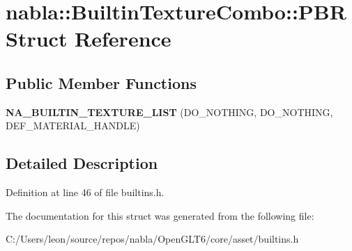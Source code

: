 \hypertarget{structnabla_1_1_builtin_texture_combo_1_1_p_b_r}{}\section{nabla\+::Builtin\+Texture\+Combo\+::P\+BR Struct Reference}
\label{structnabla_1_1_builtin_texture_combo_1_1_p_b_r}
\subsection*{Public Member Functions}
\begin{DoxyCompactItemize}
\item 
\mbox{\label{structnabla_1_1_builtin_texture_combo_1_1_p_b_r_ab6ad00dbe2325783e341075f3216237e}} 
{\bfseries N\+A\+\_\+\+B\+U\+I\+L\+T\+I\+N\+\_\+\+T\+E\+X\+T\+U\+R\+E\+\_\+\+L\+I\+ST} (D\+O\+\_\+\+N\+O\+T\+H\+I\+NG, D\+O\+\_\+\+N\+O\+T\+H\+I\+NG, D\+E\+F\+\_\+\+M\+A\+T\+E\+R\+I\+A\+L\+\_\+\+H\+A\+N\+D\+LE)
\end{DoxyCompactItemize}


\subsection{Detailed Description}


Definition at line 46 of file builtins.\+h.



The documentation for this struct was generated from the following file\+:\begin{DoxyCompactItemize}
\item 
C\+:/\+Users/leon/source/repos/nabla/\+Open\+G\+L\+T6/core/asset/builtins.\+h\end{DoxyCompactItemize}
